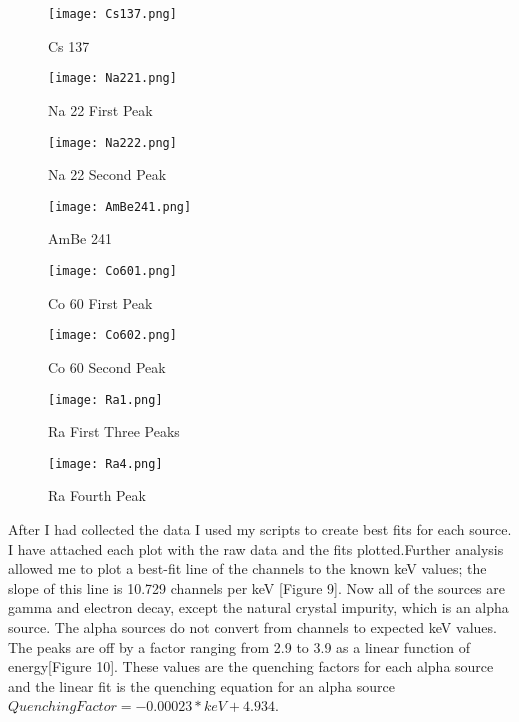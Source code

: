 \documentclass{article}
\begin{document}
\begin{figure}[H]
  \centering
  \begin{minipage}[b]{0.4\textwidth}
    \texttt{[image: Cs137.png]}
    \caption{Cs 137}
  \end{minipage}
  \hfill
  \begin{minipage}[b]{0.4\textwidth}
    \texttt{[image: Na221.png]}
    \caption{Na 22 First Peak}
  \end{minipage}
\end{figure}

\begin{figure}[H]
  \centering
  \begin{minipage}[b]{0.4\textwidth}
    \texttt{[image: Na222.png]}
    \caption{Na 22 Second Peak}
  \end{minipage}
  \hfill
  \begin{minipage}[b]{0.4\textwidth}
    \texttt{[image: AmBe241.png]}
    \caption{AmBe 241}
  \end{minipage}
\end{figure}


\begin{figure}[H]
  \centering
  \begin{minipage}[b]{0.4\textwidth}
    \texttt{[image: Co601.png]}
    \caption{Co 60 First Peak}
  \end{minipage}
  \hfill
  \begin{minipage}[b]{0.4\textwidth}
    \texttt{[image: Co602.png]}
    \caption{Co 60 Second Peak}
  \end{minipage}
\end{figure}

\begin{figure}[H]
  \centering
  \begin{minipage}[b]{0.4\textwidth}
    \texttt{[image: Ra1.png]}
    \caption{Ra First Three Peaks}
  \end{minipage}
  \hfill
  \begin{minipage}[b]{0.4\textwidth}
    \texttt{[image: Ra4.png]}
    \caption{Ra Fourth Peak}
  \end{minipage}
\end{figure}


After I had collected the data I used my scripts to create best fits for each source. I have attached each plot with the raw data and the fits plotted.Further analysis allowed me to plot a best-fit line of the channels to the known keV values; the slope of this line is 10.729 channels per keV [Figure 9]. Now all of the sources are gamma and electron decay, except the natural crystal impurity, which is an alpha source. The alpha sources do not convert from channels to expected keV values. The peaks are off by a factor ranging from 2.9 to 3.9 as a linear function of energy[Figure 10]. These values are the quenching factors for each alpha source and the linear fit is the quenching equation for an alpha source $ Quenching Factor = -0.00023*keV + 4.934$. 
\end{document}
